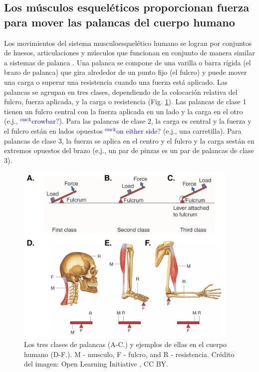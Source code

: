 \documentclass[12pt]{article}
\newcommand{\emck}[1]{\textcolor{blue}{$^{\textrm{emck}}${#1}}}
\begin{document}
\subsection*{Los músculos esqueléticos proporcionan fuerza para mover las palancas del cuerpo humano}

Los movimientos del sistema musculoesquelético humano se logran por
conjuntos de huesos, articulaciones y músculos que funcionan en
conjunto de manera similar a sistemas de palanca
\cite{leversOLI,openStax2016lever}. Una palanca se compone de una
varilla o barra rígida (el brazo de palanca) que gira alrededor de un
punto fijo (el fulcro) y puede mover una carga o superar una
resistencia cuando una fuerza está aplicado. Las palancas se agrupan
en tres clases, dependiendo de la colocación relativa del fulcro,
fuerza aplicada, y la carga o resistencia (Fig. \ref{fig:levers}). Las
palancas de clase 1 tienen un fulcro central con la fuerza aplicada en
un lado y la carga en el otro (e.j., \emck{crowbar?}). Para las
palancas de clase 2, la carga es central y la fuerza y el fulcro están
en lados opuestos \emck{on either side?} (e.j., una carretilla). Para
palancas de clase 3, la fuerza se aplica en el centro y el fulcro y la
carga sestán en extremos opuestos del brazo (e.j., un par de pinzas es
un par de palancas de clase 3).

\begin{figure}[h!]
\centering
\includegraphics[width=0.95\textwidth]{figures/levers2.png}
\caption{Los tres clases de palancas (A-C.) y ejemplos de ellas en el
  cuerpo humano (D-F.). M - musculo, F - fulcro, and R -
  resistencia. Crédito del imagen: Open Learning Initiative
  \cite{leversOLI}, CC BY.}
\label{fig:levers}
\end{figure}
\end{document}
